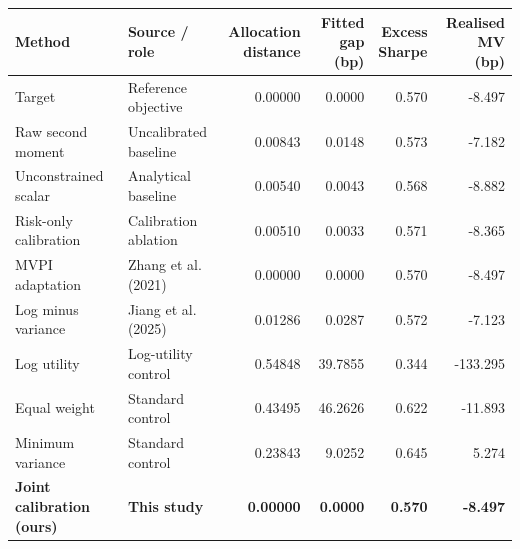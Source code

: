 \begin{tabular}{@{}p{}p{}rrrr@{}}\toprule
Method & Source / role & \shortstack{Allocation\\distance} & \shortstack{Fitted gap\\(bp)} & \shortstack{Excess\\Sharpe} & \shortstack{Realised MV\\(bp)}\\\midrule
Target & Reference objective & 0.00000 & 0.0000 & 0.570 & -8.497 \\
Raw second moment & Uncalibrated baseline & 0.00843 & 0.0148 & 0.573 & -7.182 \\
Unconstrained scalar & Analytical baseline & 0.00540 & 0.0043 & 0.568 & -8.882 \\
Risk-only calibration & Calibration ablation & 0.00510 & 0.0033 & 0.571 & -8.365 \\
MVPI adaptation & Zhang et al. (2021)~\cite{zhang2021} & 0.00000 & 0.0000 & 0.570 & -8.497 \\
Log minus variance & Jiang et al. (2025)~\cite{jiang2025} & 0.01286 & 0.0287 & 0.572 & -7.123 \\
Log utility & Log-utility control & 0.54848 & 39.7855 & 0.344 & -133.295 \\
Equal weight & Standard control & 0.43495 & 46.2626 & 0.622 & -11.893 \\
Minimum variance & Standard control & 0.23843 & 9.0252 & 0.645 & 5.274 \\
\midrule
\textbf{Joint calibration (ours)} & \textbf{This study} & \textbf{0.00000} & \textbf{0.0000} & \textbf{0.570} & \textbf{-8.497} \\
\bottomrule\end{tabular}
